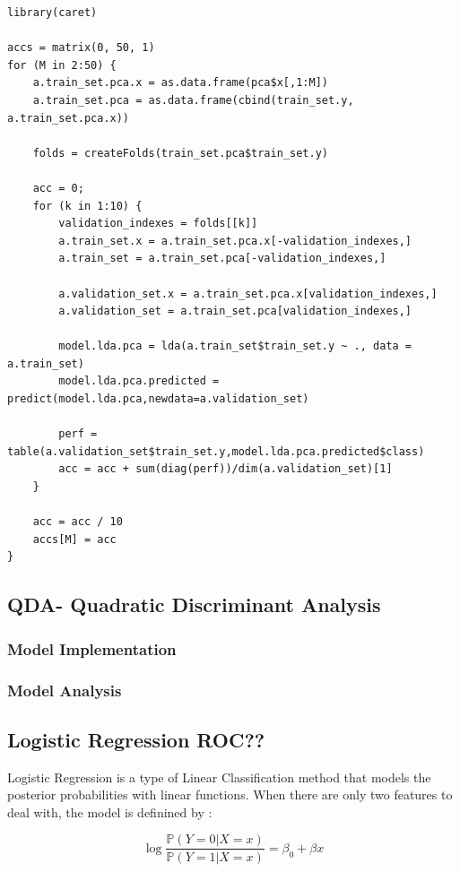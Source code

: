 \documentclass[]{report}
\begin{document}
\begin{lstlisting}
library(caret)

accs = matrix(0, 50, 1)
for (M in 2:50) {
	a.train_set.pca.x = as.data.frame(pca$x[,1:M])
	a.train_set.pca = as.data.frame(cbind(train_set.y, a.train_set.pca.x))
	
	folds = createFolds(train_set.pca$train_set.y)
	
	acc = 0;
	for (k in 1:10) {
		validation_indexes = folds[[k]]
		a.train_set.x = a.train_set.pca.x[-validation_indexes,]
		a.train_set = a.train_set.pca[-validation_indexes,]
		
		a.validation_set.x = a.train_set.pca.x[validation_indexes,]
		a.validation_set = a.train_set.pca[validation_indexes,]
		
		model.lda.pca = lda(a.train_set$train_set.y ~ ., data = a.train_set)
		model.lda.pca.predicted = predict(model.lda.pca,newdata=a.validation_set)
		
		perf = table(a.validation_set$train_set.y,model.lda.pca.predicted$class)
		acc = acc + sum(diag(perf))/dim(a.validation_set)[1]
	}

	acc = acc / 10
	accs[M] = acc
}
\end{lstlisting}



\subsection{QDA- Quadratic Discriminant Analysis}

\subsubsection{Model Implementation}

\subsubsection{Model Analysis}


\subsection{Logistic Regression  ROC??}

Logistic Regression is a type of Linear Classification method that models the posterior probabilities with linear functions. When there are only two features to deal with, the model is definined by : 

$$
\log \frac{\mathbb{P}(Y = 0 | X = x)}{\mathbb{P}(Y = 1 | X = x)} = \beta_0 + \beta x
$$
\end{document}
